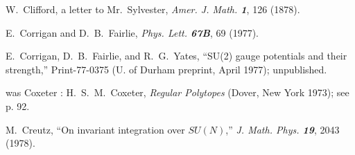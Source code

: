  W.~Clifford,
    a letter to Mr.~Sylvester,
    {\em Amer. J. Math. \bf 1}, 126 (1878). %

%


E.~Corrigan and D.~B.~Fairlie,
{\em Phys. Lett.  \bf 67B}, 69 (1977).

 E.~Corrigan, D.~B.~Fairlie, and R.~G.~Yates,
``SU(2) gauge potentials and their strength,''
Print-77-0375 (U. of Durham preprint, April 1977);
unpublished.

was Coxeter :
 H.~S.~M.~Coxeter,
    {\em Regular Polytopes}
    (Dover, New York 1973); see p. 92.


 M.~Creutz,
    ``On invariant integration over $SU(N)$,''
    {\em J. Math. Phys. \bf 19}, 2043 (1978). %

